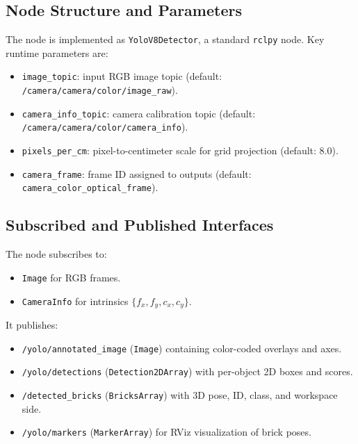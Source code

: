 \subsection{Node Structure and Parameters}
The node is implemented as \texttt{YoloV8Detector}, a standard \texttt{rclpy} node. Key runtime parameters are:
\begin{itemize}
    \item \texttt{image\_topic}: input RGB image topic (default: \texttt{/camera/camera/color/image\_raw}).
    \item \texttt{camera\_info\_topic}: camera calibration topic (default: \texttt{/camera/camera/color/camera\_info}).
    \item \texttt{pixels\_per\_cm}: pixel-to-centimeter scale for grid projection (default: 8.0).
    \item \texttt{camera\_frame}: frame ID assigned to outputs (default: \texttt{camera\_color\_optical\_frame}).
\end{itemize}

\subsection{Subscribed and Published Interfaces}
The node subscribes to:
\begin{itemize}
    \item \texttt{Image} for RGB frames.
    \item \texttt{CameraInfo} for intrinsics $\{f_x, f_y, c_x, c_y\}$.
\end{itemize}

It publishes:
\begin{itemize}
    \item \texttt{/yolo/annotated\_image} (\texttt{Image}) containing color-coded overlays and axes.
    \item \texttt{/yolo/detections} (\texttt{Detection2DArray}) with per-object 2D boxes and scores.
    \item \texttt{/detected\_bricks} (\texttt{BricksArray}) with 3D pose, ID, class, and workspace side.
    \item \texttt{/yolo/markers} (\texttt{MarkerArray}) for RViz visualization of brick poses.
\end{itemize}

